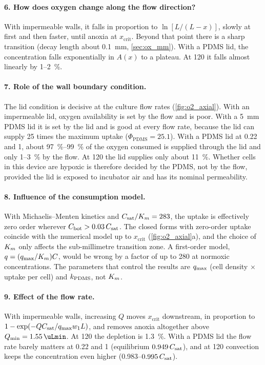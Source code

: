 \paragraph{6. How does oxygen change along the flow direction?} With impermeable walls, it falls in proportion to $\ln[L/(L-x)]$, slowly at first and then faster, until anoxia at $x_{\mathrm{crit}}$. Beyond that point there is a sharp transition (decay length about \SI{0.1}{mm}, \cref{sec:ox_mm}). With a PDMS lid, the concentration falls exponentially in $A(x)$ to a plateau. At \SI{120}{\uLmin} it falls almost linearly by 1--\SI{2}{\percent}.

\paragraph{7. Role of the wall boundary condition.} The lid condition is decisive at the culture flow rates (\cref{fig:o2_axial}). With an impermeable lid, oxygen availability is set by the flow and is poor. With a \SI{5}{mm} PDMS lid it is set by the lid and is good at every flow rate, because the lid can supply 25 times the maximum uptake ($\Phi_{\mathrm{PDMS}}=25.1$). With a PDMS lid at 0.22 and \SI{1}{\uLmin}, about \SIrange{97}{99}{\percent} of the oxygen consumed is supplied through the lid and only 1--\SI{3}{\percent} by the flow. At \SI{120}{\uLmin} the lid supplies only about \SI{11}{\percent}. Whether cells in this device are hypoxic is therefore decided by the PDMS, not by the flow, provided the lid is exposed to incubator air and has its nominal permeability.

\paragraph{8. Influence of the consumption model.} With Michaelis--Menten kinetics and $C_{\mathrm{sat}}/K_{m}=283$, the uptake is effectively zero order wherever $C_{\mathrm{bot}}>0.03\,C_{\mathrm{sat}}$. The closed forms with zero-order uptake coincide with the numerical model up to $x_{\mathrm{crit}}$ (\cref{fig:o2_axial}a), and the choice of $K_{m}$ only affects the sub-millimetre transition zone. A first-order model, $q=(q_{\max}/K_{m})C$, would be wrong by a factor of up to 280 at normoxic concentrations. The parameters that control the results are $q_{\max}$ (cell density $\times$ uptake per cell) and $k_{\mathrm{PDMS}}$, not $K_{m}$.

\paragraph{9. Effect of the flow rate.} With impermeable walls, increasing $Q$ moves $x_{\mathrm{crit}}$ downstream, in proportion to $1-\exp(-QC_{\mathrm{sat}}/q_{\max} w_1L)$, and removes anoxia altogether above $Q_{\min}=\SI{1.55}{\uLmin}$. At \SI{120}{\uLmin} the depletion is \SI{1.3}{\percent}. With a PDMS lid the flow rate barely matters at 0.22 and \SI{1}{\uLmin} (equilibrium $0.949\,C_{\mathrm{sat}}$), and at \SI{120}{\uLmin} convection keeps the concentration even higher (0.983--$0.995\,C_{\mathrm{sat}}$).


